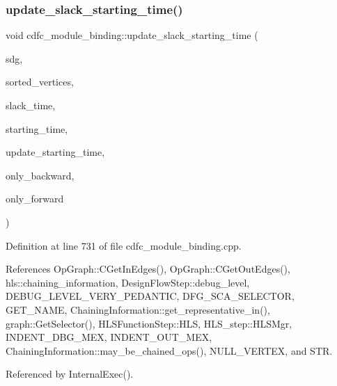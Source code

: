 \subsubsection{\texorpdfstring{update\+\_\+slack\+\_\+starting\+\_\+time()}{update\_slack\_starting\_time()}}
{\footnotesize\ttfamily void cdfc\+\_\+module\+\_\+binding\+::update\+\_\+slack\+\_\+starting\+\_\+time (\begin{DoxyParamCaption}\item[{const \hyperlink{op__graph_8hpp_a9a0b240622c47584bee6951a6f5de746}{Op\+Graph\+Const\+Ref}}]{sdg,  }\item[{\hyperlink{classOpVertexSet}{Op\+Vertex\+Set} \&}]{sorted\+\_\+vertices,  }\item[{\hyperlink{custom__map_8hpp_ad1ed68f2ff093683ab1a33522b144adc}{Custom\+Unordered\+Map}$<$ \hyperlink{graph_8hpp_abefdcf0544e601805af44eca032cca14}{vertex}, double $>$ \&}]{slack\+\_\+time,  }\item[{\hyperlink{custom__map_8hpp_ad1ed68f2ff093683ab1a33522b144adc}{Custom\+Unordered\+Map}$<$ \hyperlink{graph_8hpp_abefdcf0544e601805af44eca032cca14}{vertex}, double $>$ \&}]{starting\+\_\+time,  }\item[{bool}]{update\+\_\+starting\+\_\+time,  }\item[{bool}]{only\+\_\+backward,  }\item[{bool}]{only\+\_\+forward }\end{DoxyParamCaption})\hspace{0.3cm}{\ttfamily [protected]}}



Definition at line 731 of file cdfc\+\_\+module\+\_\+binding.\+cpp.



References Op\+Graph\+::\+C\+Get\+In\+Edges(), Op\+Graph\+::\+C\+Get\+Out\+Edges(), hls\+::chaining\+\_\+information, Design\+Flow\+Step\+::debug\+\_\+level, D\+E\+B\+U\+G\+\_\+\+L\+E\+V\+E\+L\+\_\+\+V\+E\+R\+Y\+\_\+\+P\+E\+D\+A\+N\+T\+IC, D\+F\+G\+\_\+\+S\+C\+A\+\_\+\+S\+E\+L\+E\+C\+T\+OR, G\+E\+T\+\_\+\+N\+A\+ME, Chaining\+Information\+::get\+\_\+representative\+\_\+in(), graph\+::\+Get\+Selector(), H\+L\+S\+Function\+Step\+::\+H\+LS, H\+L\+S\+\_\+step\+::\+H\+L\+S\+Mgr, I\+N\+D\+E\+N\+T\+\_\+\+D\+B\+G\+\_\+\+M\+EX, I\+N\+D\+E\+N\+T\+\_\+\+O\+U\+T\+\_\+\+M\+EX, Chaining\+Information\+::may\+\_\+be\+\_\+chained\+\_\+ops(), N\+U\+L\+L\+\_\+\+V\+E\+R\+T\+EX, and S\+TR.



Referenced by Internal\+Exec().

